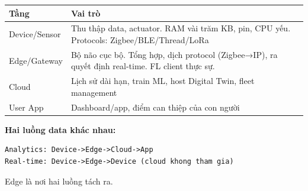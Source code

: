 \documentclass[9pt,a4paper,twocolumn]{article}
\begin{document}
\begin{tcolorbox}[deepbox, title={Kiến trúc 4 tầng IoT --- Chi tiết}]

\begin{tabular}{@{}p{1.6cm}p{3.8cm}@{}}
\toprule
\scriptsize Tầng & \scriptsize Vai trò \\
\midrule
\scriptsize Device/Sensor & \scriptsize Thu thập data, actuator. RAM vài trăm KB, pin, CPU yếu. Protocols: Zigbee/BLE/Thread/LoRa \\
\scriptsize Edge/Gateway & \scriptsize Bộ não cục bộ. Tổng hợp, dịch protocol (Zigbee→IP), ra quyết định real-time. FL client thực sự. \\
\scriptsize Cloud & \scriptsize Lịch sử dài hạn, train ML, host Digital Twin, fleet management \\
\scriptsize User App & \scriptsize Dashboard/app, điểm can thiệp của con người \\
\bottomrule
\end{tabular}

\vspace{3pt}
\textbf{Hai luồng data khác nhau:}
\begin{lstlisting}
Analytics: Device->Edge->Cloud->App
Real-time: Device->Edge->Device (cloud khong tham gia)
\end{lstlisting}
Edge là nơi hai luồng tách ra.

\end{tcolorbox}
\end{document}
